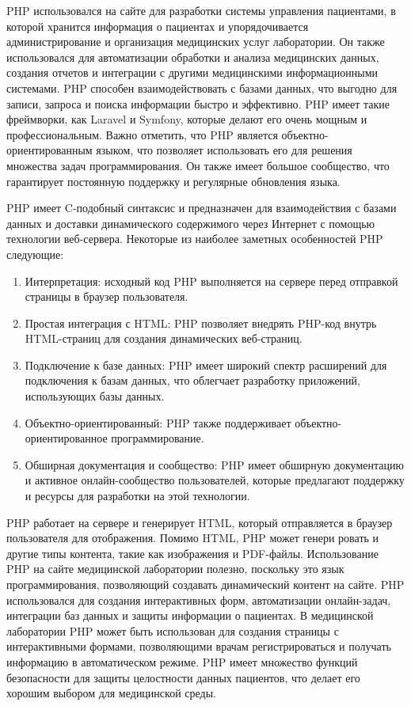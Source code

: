 PHP использовался на сайте для разработки системы управления пациентами, в которой хранится информация о пациентах и упорядочивается администрирование и организация медицинских услуг лаборатории. Он также использовался для автоматизации обработки и анализа медицинских данных, создания отчетов и интеграции с другими медицинскими информационными системами. PHP способен взаимодействовать с базами данных, что выгодно для записи, запроса и поиска информации быстро и эффективно\cite{php2}.
PHP имеет такие фреймворки, как Laravel и Symfony, которые делают его очень мощным и профессиональным. Важно отметить, что PHP является объектно-ориентированным языком, что позволяет использовать его для решения множества задач программирования. Он также имеет большое сообщество, что гарантирует постоянную поддержку и регулярные обновления языка\cite{php1}. 

PHP имеет C-подобный синтаксис и предназначен для взаимодействия с базами данных и доставки динамического содержимого через Интернет с помощью технологии веб-сервера. Некоторые из наиболее заметных особенностей PHP следующие:

\begin{enumerate}
	\item Интерпретация: исходный код PHP выполняется на сервере перед отправкой страницы в браузер пользователя.
	\item Простая интеграция с HTML: PHP позволяет внедрять PHP-код внутрь HTML-страниц для создания динамических веб-страниц.
	\item Подключение к базе данных: PHP имеет широкий спектр расширений для подключения к базам данных, что облегчает разработку приложений, использующих базы данных.
	\item Объектно-ориентированный: PHP также поддерживает объектно-ориентированное программирование.
	\item Обширная документация и сообщество: PHP имеет обширную документацию и активное онлайн-сообщество пользователей, которые предлагают поддержку и ресурсы для разработки на этой технологии.
\end{enumerate}

PHP работает на сервере и генерирует HTML, который отправляется в браузер пользователя для отображения. Помимо HTML, PHP может генери ровать и другие типы контента, такие как изображения и PDF-файлы.
Использование PHP на сайте медицинской лаборатории полезно, поскольку это язык программирования, позволяющий создавать динамический контент на сайте. PHP использовался для создания интерактивных форм, автоматизации онлайн-задач, интеграции баз данных и защиты информации о пациентах.
В медицинской лаборатории PHP может быть использован для создания страницы с интерактивными формами, позволяющими врачам регистрироваться и получать информацию в автоматическом режиме.
PHP имеет множество функций безопасности для защиты целостности данных пациентов, что делает его хорошим выбором для медицинской среды.

